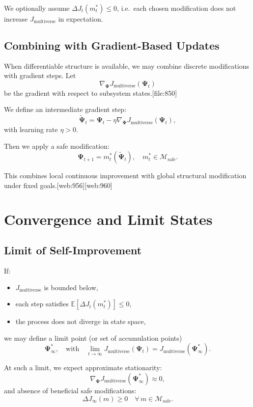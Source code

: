 \documentclass[12pt]{article}
\begin{document}
We optionally assume $\Delta J_t(m_t^*) \le 0$, i.e.\ each chosen
modification does not increase $J_{\text{multiverse}}$ in expectation.

\subsection{Combining with Gradient-Based Updates}

When differentiable structure is available, we may combine discrete
modifications with gradient steps. Let
\[
\nabla_{\bm{\Psi}} J_{\text{multiverse}}(\bm{\Psi}_t)
\]
be the gradient with respect to subsystem states.[file:850]

We define an intermediate gradient step:
\[
\tilde{\bm{\Psi}}_t =
\bm{\Psi}_t - \eta
\nabla_{\bm{\Psi}} J_{\text{multiverse}}(\bm{\Psi}_t),
\]
with learning rate $\eta > 0$.

Then we apply a safe modification:
\[
\bm{\Psi}_{t+1} =
m_t^*(\tilde{\bm{\Psi}}_t),
\quad
m_t^* \in \mathcal{M}_{\text{safe}}.
\]

This combines local continuous improvement with global structural
modification under fixed goals.[web:956][web:960]

\section{Convergence and Limit States}

\subsection{Limit of Self-Improvement}

If:
\begin{itemize}
  \item $J_{\text{multiverse}}$ is bounded below,
  \item each step satisfies $\mathbb{E}[\Delta J_t(m_t^*)] \le 0$,
  \item the process does not diverge in state space,
\end{itemize}
we may define a limit point (or set of accumulation points)
\[
\bm{\Psi}_\infty^*,
\quad
\text{with}
\quad
\lim_{t \to \infty}
J_{\text{multiverse}}(\bm{\Psi}_t)
=
J_{\text{multiverse}}(\bm{\Psi}_\infty^*).
\]

At such a limit, we expect approximate stationarity:
\[
\nabla_{\bm{\Psi}} J_{\text{multiverse}}(\bm{\Psi}_\infty^*) \approx 0,
\]
and absence of beneficial safe modifications:
\[
\Delta J_\infty(m) \ge 0
\quad
\forall\, m \in \mathcal{M}_{\text{safe}}.
\]
\end{document}
